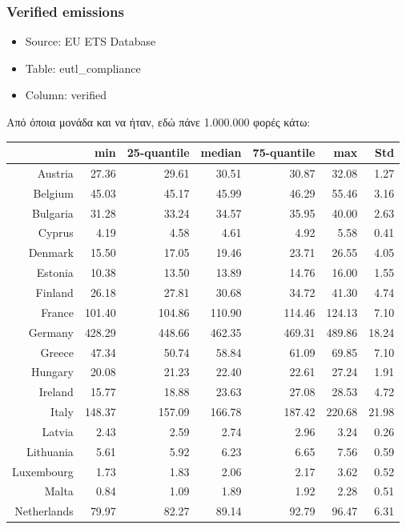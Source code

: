 \documentclass[a4paper,twoside,10pt]{article}
\begin{document}
\subsubsection{Verified emissions}
	\begin{itemize}
	\item Source: EU ETS Database
	\item Table: eutl\_compliance
	\item Column: verified
\end{itemize} 
Από όποια μονάδα και να ήταν, εδώ πάνε 1.000.000 φορές κάτω:
\begin{table}[H]
	\centering
	\begin{tabular}{|r|rrrrr|r|}
  \hline
& min & 25-quantile & median & 75-quantile & max & Std \\ 
\hline
Austria & 27.36 & 29.61 & 30.51 & 30.87 & 32.08 & 1.27 \\ 
Belgium & 45.03 & 45.17 & 45.99 & 46.29 & 55.46 & 3.16 \\ 
Bulgaria & 31.28 & 33.24 & 34.57 & 35.95 & 40.00 & 2.63 \\ 
Cyprus & 4.19 & 4.58 & 4.61 & 4.92 & 5.58 & 0.41 \\ 
Denmark & 15.50 & 17.05 & 19.46 & 23.71 & 26.55 & 4.05 \\   \hline
Estonia & 10.38 & 13.50 & 13.89 & 14.76 & 16.00 & 1.55 \\ 
Finland & 26.18 & 27.81 & 30.68 & 34.72 & 41.30 & 4.74 \\ 
France & 101.40 & 104.86 & 110.90 & 114.46 & 124.13 & 7.10 \\ 
Germany & 428.29 & 448.66 & 462.35 & 469.31 & 489.86 & 18.24 \\ 
Greece & 47.34 & 50.74 & 58.84 & 61.09 & 69.85 & 7.10 \\   \hline
Hungary & 20.08 & 21.23 & 22.40 & 22.61 & 27.24 & 1.91 \\ 
Ireland & 15.77 & 18.88 & 23.63 & 27.08 & 28.53 & 4.72 \\ 
Italy & 148.37 & 157.09 & 166.78 & 187.42 & 220.68 & 21.98 \\ 
Latvia & 2.43 & 2.59 & 2.74 & 2.96 & 3.24 & 0.26 \\ 
Lithuania & 5.61 & 5.92 & 6.23 & 6.65 & 7.56 & 0.59 \\   \hline
Luxembourg & 1.73 & 1.83 & 2.06 & 2.17 & 3.62 & 0.52 \\ 
Malta & 0.84 & 1.09 & 1.89 & 1.92 & 2.28 & 0.51 \\ 
Netherlands & 79.97 & 82.27 & 89.14 & 92.79 & 96.47 & 6.31 \\ 

\end{tabular}
\end{table}
\end{document}
